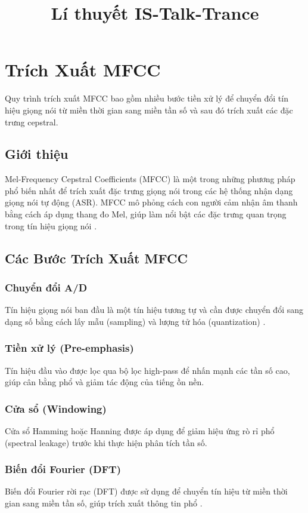\documentclass{article}
\begin{document}
\title{Lí thuyết IS-Talk-Trance}
\author{}
\date{}
\maketitle

\section{Trích Xuất MFCC}
Quy trình trích xuất MFCC bao gồm nhiều bước tiền xử lý để chuyển đổi tín hiệu giọng nói từ miền thời gian sang miền tần số và sau đó trích xuất các đặc trưng cepstral.

\subsection{Giới thiệu}
Mel-Frequency Cepstral Coefficients (MFCC) là một trong những phương pháp phổ biến nhất để trích xuất đặc trưng giọng nói trong các hệ thống nhận dạng giọng nói tự động (ASR). MFCC mô phỏng cách con người cảm nhận âm thanh bằng cách áp dụng thang đo Mel, giúp làm nổi bật các đặc trưng quan trọng trong tín hiệu giọng nói \cite{davis1980comparison}.

\subsection{Các Bước Trích Xuất MFCC}
\subsubsection{Chuyển đổi A/D}
Tín hiệu giọng nói ban đầu là một tín hiệu tương tự và cần được chuyển đổi sang dạng số bằng cách lấy mẫu (sampling) và lượng tử hóa (quantization) \cite{oppenheim1999discrete}.

\subsubsection{Tiền xử lý (Pre-emphasis)}
Tín hiệu đầu vào được lọc qua bộ lọc high-pass để nhấn mạnh các tần số cao, giúp cân bằng phổ và giảm tác động của tiếng ồn nền.

\subsubsection{Cửa sổ (Windowing)}
Cửa sổ Hamming hoặc Hanning được áp dụng để giảm hiệu ứng rò rỉ phổ (spectral leakage) trước khi thực hiện phân tích tần số.

\subsubsection{Biến đổi Fourier (DFT)}
Biến đổi Fourier rời rạc (DFT) được sử dụng để chuyển tín hiệu từ miền thời gian sang miền tần số, giúp trích xuất thông tin phổ \cite{rabiner1993fundamentals}.
\end{document}
